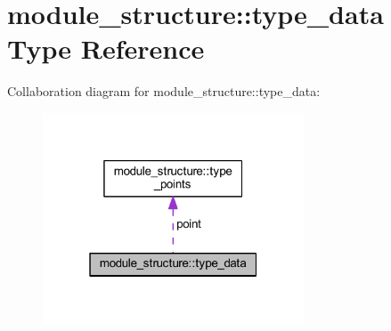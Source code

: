 \hypertarget{structmodule__structure_1_1type__data}{}\section{module\+\_\+structure\+:\+:type\+\_\+data Type Reference}
\label{structmodule__structure_1_1type__data}


Collaboration diagram for module\+\_\+structure\+:\+:type\+\_\+data\+:\nopagebreak
\begin{figure}[H]
\begin{center}
\leavevmode
\includegraphics[width=220pt]{structmodule__structure_1_1type__data__coll__graph}
\end{center}
\end{figure}
